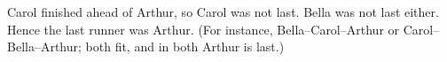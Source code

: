 Carol finished ahead of Arthur, so Carol was not last. Bella was not last either. Hence the last runner was $\boxed{\text{Arthur}}$. (For instance, Bella--Carol--Arthur or Carol--Bella--Arthur; both fit, and in both Arthur is last.)
